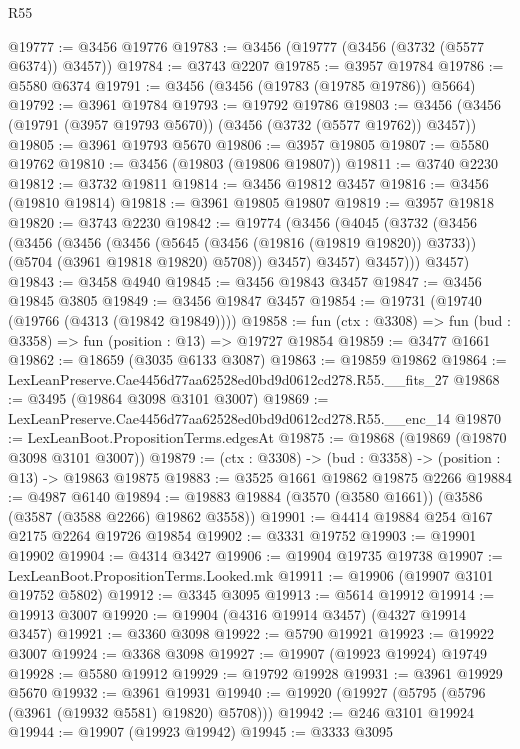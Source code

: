 \begin{lexlean}{R55}
\begin{coremodule}
@19777 := @3456 @19776
@19783 := @3456 (@19777 (@3456 (@3732 (@5577 @6374)) @3457))
@19784 := @3743 @2207
@19785 := @3957 @19784
@19786 := @5580 @6374
@19791 := @3456 (@3456 (@19783 (@19785 @19786)) @5664)
@19792 := @3961 @19784
@19793 := @19792 @19786
@19803 := @3456 (@3456 (@19791 (@3957 @19793 @5670)) (@3456 (@3732 (@5577 @19762)) @3457))
@19805 := @3961 @19793 @5670
@19806 := @3957 @19805
@19807 := @5580 @19762
@19810 := @3456 (@19803 (@19806 @19807))
@19811 := @3740 @2230
@19812 := @3732 @19811
@19814 := @3456 @19812 @3457
@19816 := @3456 (@19810 @19814)
@19818 := @3961 @19805 @19807
@19819 := @3957 @19818
@19820 := @3743 @2230
@19842 := @19774
    (@3456
      (@4045
        (@3732
          (@3456
            (@3456
              (@3456
                (@3456
                  (@5645 (@3456 (@19816 (@19819 @19820)) @3733))
                  (@5704 (@3961 @19818 @19820) @5708))
                @3457)
              @3457)
            @3457)))
      @3457)
@19843 := @3458 @4940
@19845 := @3456 @19843 @3457
@19847 := @3456 @19845 @3805
@19849 := @3456 @19847 @3457
@19854 := @19731 (@19740 (@19766 (@4313 (@19842 @19849))))
@19858 := fun (ctx : @3308) => fun (bud : @3358) => fun (position : @13) => @19727 @19854
@19859 := @3477 @1661
@19862 := @18659 (@3035 @6133 @3087)
@19863 := @19859 @19862
@19864 := LexLeanPreserve.Cae4456d77aa62528ed0bd9d0612cd278.R55.__fits_27
@19868 := @3495 (@19864 @3098 @3101 @3007)
@19869 := LexLeanPreserve.Cae4456d77aa62528ed0bd9d0612cd278.R55.__enc_14
@19870 := LexLeanBoot.PropositionTerms.edgesAt
@19875 := @19868 (@19869 (@19870 @3098 @3101 @3007))
@19879 := (ctx : @3308) -> (bud : @3358) -> (position : @13) -> @19863 @19875
@19883 := @3525 @1661 @19862 @19875 @2266
@19884 := @4987 @6140
@19894 := @19883 @19884 (@3570 (@3580 @1661)) (@3586 (@3587 (@3588 @2266) @19862 @3558))
@19901 := @4414 @19884 @254 @167 @2175 @2264 @19726 @19854
@19902 := @3331 @19752
@19903 := @19901 @19902
@19904 := @4314 @3427
@19906 := @19904 @19735 @19738
@19907 := LexLeanBoot.PropositionTerms.Looked.mk
@19911 := @19906 (@19907 @3101 @19752 @5802)
@19912 := @3345 @3095
@19913 := @5614 @19912
@19914 := @19913 @3007
@19920 := @19904 (@4316 @19914 @3457) (@4327 @19914 @3457)
@19921 := @3360 @3098
@19922 := @5790 @19921
@19923 := @19922 @3007
@19924 := @3368 @3098
@19927 := @19907 (@19923 @19924) @19749
@19928 := @5580 @19912
@19929 := @19792 @19928
@19931 := @3961 @19929 @5670
@19932 := @3961 @19931
@19940 := @19920 (@19927 (@5795 (@5796 (@3961 (@19932 @5581) @19820) @5708)))
@19942 := @246 @3101 @19924
@19944 := @19907 (@19923 @19942)
@19945 := @3333 @3095

\end{coremodule}
\end{lexlean}
